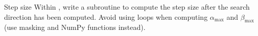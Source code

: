  %

\begin{problem}{Step size}{}%
Within , write a subroutine to compute the step size after the search direction has been computed.
Avoid using loops when computing $\alpha_{\max}$ and $\beta_{\max}$ (use masking and NumPy functions instead).
\end{problem}

